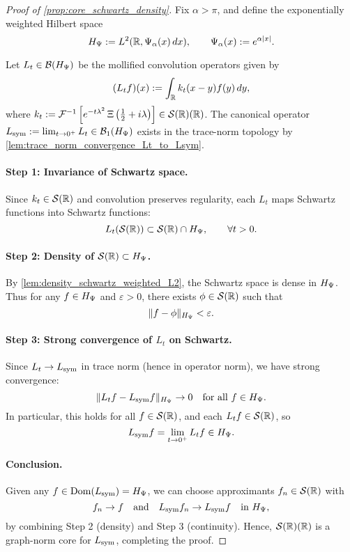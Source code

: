 \begin{proof}[Proof of \cref{prop:core_schwartz_density}]
Fix \( \alpha > \pi \), and define the exponentially weighted Hilbert space
\[
H_{\Psi} := L^2(\mathbb{R}, \Psi_\alpha(x)\, dx), \qquad \Psi_\alpha(x) := e^{\alpha |x|}.
\]

Let \( L_t \in \mathcal{B}(H_{\Psi}) \) be the mollified convolution operators given by
\[
(L_t f)(x) := \int_{\mathbb{R}} k_t(x - y) f(y)\, dy,
\]
where \( k_t := \mathcal{F}^{-1}\left[ e^{-t\lambda^2} \, \Xi\left(\tfrac{1}{2} + i\lambda \right) \right] \in \mathcal{S}(\mathbb{R})(\mathbb{R}) \). The canonical operator \( L_{\mathrm{sym}} := \lim_{t \to 0^+} L_t \in \mathcal{B}_1(H_{\Psi}) \) exists in the trace-norm topology by \cref{lem:trace_norm_convergence_Lt_to_Lsym}.

\paragraph{Step 1: Invariance of Schwartz space.}
Since \( k_t \in \mathcal{S}(\mathbb{R}) \) and convolution preserves regularity, each \( L_t \) maps Schwartz functions into Schwartz functions:
\[
L_t(\mathcal{S}(\mathbb{R})) \subset \mathcal{S}(\mathbb{R}) \cap H_{\Psi}, \qquad \forall t > 0.
\]

\paragraph{Step 2: Density of \( \mathcal{S}(\mathbb{R}) \subset H_{\Psi} \).}
By \cref{lem:density_schwartz_weighted_L2}, the Schwartz space is dense in \( H_{\Psi} \). Thus for any \( f \in H_{\Psi} \) and \( \varepsilon > 0 \), there exists \( \phi \in \mathcal{S}(\mathbb{R}) \) such that
\[
\|f - \phi\|_{H_{\Psi}} < \varepsilon.
\]

\paragraph{Step 3: Strong convergence of \( L_t \) on Schwartz.}
Since \( L_t \to L_{\mathrm{sym}} \) in trace norm (hence in operator norm), we have strong convergence:
\[
\|L_t f - L_{\mathrm{sym}} f\|_{H_{\Psi}} \to 0 \quad \text{for all } f \in H_{\Psi}.
\]
In particular, this holds for all \( f \in \mathcal{S}(\mathbb{R}) \), and each \( L_t f \in \mathcal{S}(\mathbb{R}) \), so
\[
L_{\mathrm{sym}} f = \lim_{t \to 0^+} L_t f \in H_{\Psi}.
\]

\paragraph{Conclusion.}
Given any \( f \in \operatorname{Dom}(L_{\mathrm{sym}}) = H_{\Psi} \), we can choose approximants \( f_n \in \mathcal{S}(\mathbb{R}) \) with
\[
f_n \to f \quad \text{and} \quad L_{\mathrm{sym}} f_n \to L_{\mathrm{sym}} f \quad \text{in } H_{\Psi},
\]
by combining Step 2 (density) and Step 3 (continuity). Hence, \( \mathcal{S}(\mathbb{R})(\mathbb{R}) \) is a graph-norm core for \( L_{\mathrm{sym}} \), completing the proof.
\end{proof}

